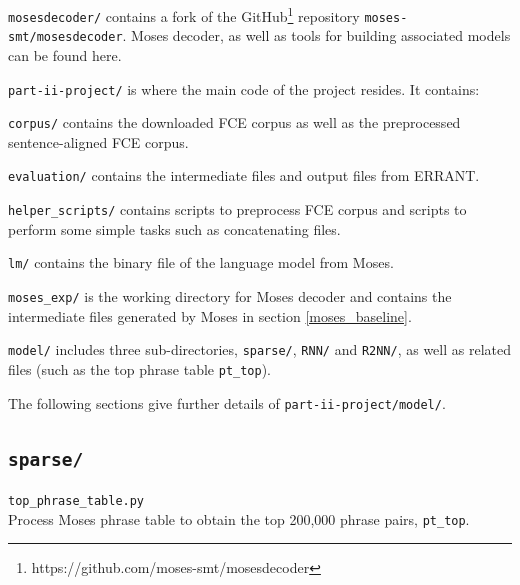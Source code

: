 \documentclass[12pt,a4paper,twoside,openright]{report}
\begin{document}
\texttt{mosesdecoder/} contains a fork of the GitHub\footnote{https://github.com/moses-smt/mosesdecoder} repository \texttt{moses-smt/mosesdecoder}\cite{moses}. Moses decoder, as well as tools for building associated models can be found here.

\texttt{part-ii-project/} is where the main code of the project resides. It contains:

\hfill\begin{minipage}{\dimexpr\textwidth-1cm}
    \texttt{corpus/} contains the downloaded FCE corpus as well as the preprocessed sentence-aligned FCE corpus.
\end{minipage}

\hfill\begin{minipage}{\dimexpr\textwidth-1cm}
    \texttt{evaluation/} contains the intermediate files and output files from ERRANT.
\end{minipage}

\hfill\begin{minipage}{\dimexpr\textwidth-1cm}
    \texttt{helper\_scripts/} contains scripts to preprocess FCE corpus and scripts to perform some simple tasks such as concatenating files.
\end{minipage}

\hfill\begin{minipage}{\dimexpr\textwidth-1cm}
    \texttt{lm/} contains the binary file of the language model from Moses.
\end{minipage}

\hfill\begin{minipage}{\dimexpr\textwidth-1cm}
    \texttt{moses\_exp/} is the working directory for Moses decoder and contains the intermediate files generated by Moses in section \ref{moses_baseline}.
\end{minipage}

\hfill\begin{minipage}{\dimexpr\textwidth-1cm}
    \texttt{model/} includes three sub-directories, \texttt{sparse/}, \texttt{RNN/} and \texttt{R2NN/}, as well as related files (such as the top phrase table \texttt{pt\_top}).
\end{minipage}

The following sections give further details of \texttt{part-ii-project/model/}.

\subsection{\texttt{sparse/}}
\texttt{top\_phrase\_table.py}\\
Process Moses phrase table to obtain the top 200,000 phrase pairs, \texttt{pt\_top}.
\end{document}
